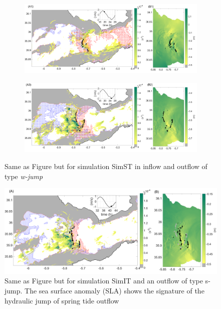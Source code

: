 \begin{figure}[!h]
 \centering
\begin{subfigure}{\linewidth}
\centering
\includegraphics[width=\linewidth]{./GBR3D/VE2_19h30_p.png}
\end{subfigure}

\begin{subfigure}{\linewidth}
\centering
\includegraphics[width=\linewidth]{./GBR3D/VE2_25h_p.png}
\end{subfigure}
\caption [Supercritical flow, location of hydraulic jump, standard deviation of parameter $Q$ in SimST.]{Same as Figure  but for simulation SimST in inflow and outflow of type \textit{w-jump}}
\label{FigHCS}
\end{figure}

\begin{figure}[!h]
 \centering
\includegraphics[width=\linewidth]{./GBR3D/IES_41h_p.png}
 \caption [Supercritical flow, location of hydraulic jump, standard deviation of parameter $Q$ in SimIT.]{Same as Figure  but for simulation SimIT and an outflow of type {s-jump}. The sea surface anomaly (SLA) shows the signature of the hydraulic jump of spring tide outflow}
 \label{FigHCI}
\end{figure}

